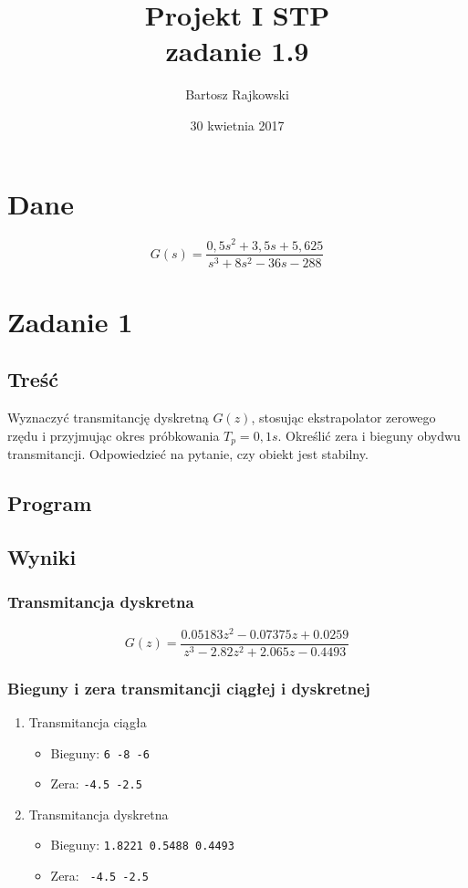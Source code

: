 \documentclass{article}
\author{Bartosz Rajkowski}
\title{Projekt I STP\\zadanie 1.9}
\date{30 kwietnia 2017}
\begin{document}
\maketitle
\newpage
\tableofcontents
\newpage

\section*{Dane}
$$
G(s)=\frac{0,5s^2+3,5s+5,625}{s^3+8s^2-36s-288}
$$
\section{Zadanie 1}
\subsection{Treść}

Wyznaczyć transmitancję dyskretną $G(z)$, stosując ekstrapolator zerowego rzędu i przyjmując okres próbkowania $T_p=0,1s$. Określić zera i bieguny obydwu transmitancji. Odpowiedzieć na pytanie, czy obiekt jest stabilny.

\subsection{Program}

\subsection{Wyniki}
\subsubsection{Transmitancja dyskretna}
$$
G(z)=\frac{0.05183 z^2 - 0.07375 z + 0.0259}{z^3 - 2.82 z^2 + 2.065 z - 0.4493}
$$
\subsubsection[Bieguny i zera]{Bieguny i zera transmitancji ciągłej i dyskretnej}
\begin{enumerate}
\item Transmitancja ciągła
\begin{itemize}
\item Bieguny: \verb+6 -8 -6+
\item Zera: \verb+-4.5 -2.5+
\end{itemize}

\item Transmitancja dyskretna
\begin{itemize}
\item Bieguny: \verb+1.8221 0.5488 0.4493+
\item Zera: \verb+ -4.5 -2.5+
\end{itemize}
\end{enumerate}
\end{document}
